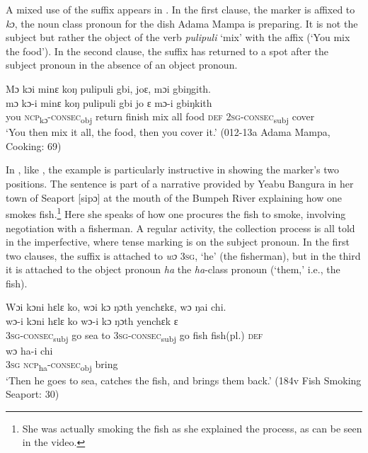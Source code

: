 A mixed use of the suffix appears in . In the first clause, the marker is affixed to \textit{kɔ}, the noun class pronoun for the dish Adama Mampa is preparing. It is not the subject but rather the object of the verb \textit{pulipuli} ‘mix' with the affix (‘You mix the food'). In the second clause, the suffix has returned to a spot after the subject pronoun in the absence of an object pronoun.

\ea%
    \label{ex:205}
    Mɔ kɔi minɛ koŋ pulipuli gbi, joɛ, mɔi gbiŋgith.\\
    \gll mɔ  kɔ-i          minɛ    koŋ  pulipuli  gbi  jo    ɛ    mɔ-i          gbiŋkith\\
    you  \textsc{ncp}\textsubscript{kɔ}{}-\textsc{consec}\textsubscript{obj}  return    finish  mix    all    food  \textsc{def}  \textsc{2sg}{}-\textsc{consec}\textsubscript{subj}  cover\\
    \glt ‘You then mix it all, the food, then you cover it.' (012-13a Adama Mampa, Cooking: 69)
\z

In , like , the example is particularly instructive in showing the marker's two positions. The sentence is part of a narrative provided by Yeabu Bangura in her town of Seaport [sipɔ] at the mouth of the Bumpeh River explaining how one smokes fish.\footnote{She was actually smoking the fish as she explained the process, as can be seen in the video.} Here she speaks of how one procures the fish to smoke, involving negotiation with a fisherman. A regular activity, the collection process is all told in the imperfective, where tense marking is on the subject pronoun. In the first two clauses, the suffix is attached to \textit{wɔ} \textsc{3sg}, ‘he' (the fisherman), but in the third it is attached to the object pronoun \textit{ha} the \textit{ha}{}-class pronoun (‘them,' i.e., the fish).

\ea%
    \label{ex:206}
    Wɔi kɔni hɛlɛ ko, wɔi kɔ ŋɔth yenchɛkɛ, wɔ ŋai chi.\\
    \gll wɔ{}-i          kɔni  hɛlɛ  ko    wɔ{}-i          kɔ    ŋɔth  yenchɛk    ɛ\\
    \textsc{3sg}{}-\textsc{consec}\textsubscript{subj}  go    sea  to    \textsc{3sg}{}-\textsc{consec}\textsubscript{subj}  go    fish  fish(pl.)    \textsc{def}\\
    \gll wɔ    ha-i          chi\\
    \textsc{3sg}  \textsc{ncp}\textsubscript{ha}{}-\textsc{consec}\textsubscript{obj}  bring\\
    \glt ‘Then he goes to sea, catches the fish, and brings them back.' (184v Fish Smoking Seaport: 30)
\z

